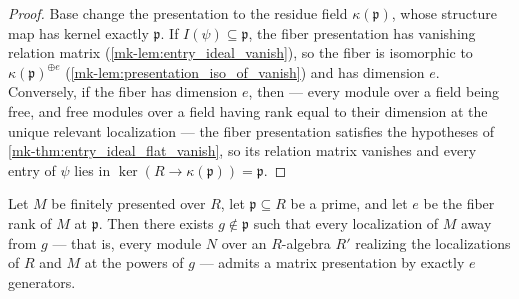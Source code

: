 \begin{proof}
  \leanok
  Base change the presentation to the residue field
  \(\kappa(\mathfrak p)\), whose structure map has kernel exactly
  \(\mathfrak p\).  If \(I(\psi) \subseteq \mathfrak p\), the fiber
  presentation has vanishing relation matrix
  (\ref{mk-lem:entry_ideal_vanish}), so the fiber is isomorphic to
  \(\kappa(\mathfrak p)^{\oplus e}\)
  (\ref{mk-lem:presentation_iso_of_vanish}) and has dimension \(e\).
  Conversely, if the fiber has dimension \(e\), then --- every module over
  a field being free, and free modules over a field having rank equal to
  their dimension at the unique relevant localization --- the fiber
  presentation satisfies the hypotheses of
  \ref{mk-thm:entry_ideal_flat_vanish}, so its relation matrix vanishes and
  every entry of \(\psi\) lies in
  \(\ker(R \to \kappa(\mathfrak p)) = \mathfrak p\).
\end{proof}

\begin{theorem}
  \label{mk-thm:nakayama_prolongation}
  \leanok

  Let \(M\) be finitely presented over \(R\), let \(\mathfrak p \subseteq R\)
  be a prime, and let \(e\) be the fiber rank of \(M\) at \(\mathfrak p\).
  Then there exists \(g \notin \mathfrak p\) such that every localization of
  \(M\) away from \(g\) --- that is, every module \(N\) over an \(R\)-algebra
  \(R'\) realizing the localizations of \(R\) and \(M\) at the powers of
  \(g\) --- admits a matrix presentation by exactly \(e\) generators.
\end{theorem}

